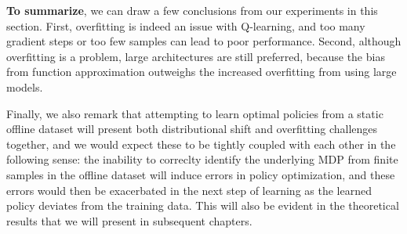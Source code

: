 \textbf{To summarize}, we can draw a few conclusions from our experiments in this section. First, overfitting is indeed an issue with Q-learning, and too many gradient steps or too few samples can lead to poor performance. Second, although overfitting is a problem, large architectures are still preferred, because the bias from function approximation outweighs the increased overfitting from using large models. 

Finally, we also remark that attempting to learn optimal policies from a static offline dataset will present both distributional shift and overfitting challenges together, and we would expect these to be tightly coupled with each other in the following sense: the inability to correclty identify the underlying MDP from finite samples in the offline dataset will induce errors in policy optimization, and these errors would then be exacerbated in the next step of learning as the learned policy deviates from the training data. This will also be evident in the theoretical results that we will present in subsequent chapters.    